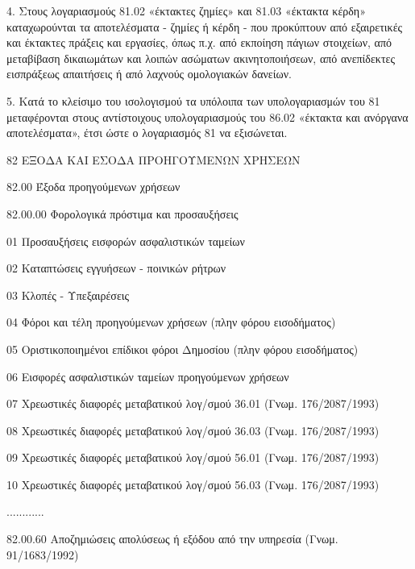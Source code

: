 \documentclass[A4,10pt,greek]{book}
\begin{document}
4. Στους λογαριασμούς 81.02 «έκτακτες ζημίες» και 81.03 «έκτακτα κέρδη» καταχωρούνται τα αποτελέσματα - ζημίες ή κέρδη - που προκύπτουν από εξαιρετικές και έκτακτες πράξεις και εργασίες, όπως π.χ. από εκποίηση πάγιων στοιχείων, από μεταβίβαση δικαιωμάτων και λοιπών ασώματων ακινητοποιήσεων, από ανεπίδεκτες εισπράξεως απαιτήσεις ή από λαχνούς ομολογιακών δανείων.

5. Κατά το κλείσιμο του ισολογισμού τα υπόλοιπα των υπολογαριασμών του 81 μεταφέρονται στους αντίστοιχους υπολογαριασμούς του 86.02 «έκτακτα και ανόργανα αποτελέσματα», έτσι ώστε ο λογαριασμός 81 να εξισώνεται.

82    ΕΞΟΔΑ ΚΑΙ ΕΣΟΔΑ ΠΡΟΗΓΟΥΜΕΝΩΝ ΧΡΗΣΕΩΝ

        82.00    Έξοδα προηγούμενων χρήσεων

                     82.00.00    Φορολογικά πρόστιμα και προσαυξήσεις

                               01    Προσαυξήσεις εισφορών ασφαλιστικών ταμείων

                               02    Καταπτώσεις εγγυήσεων - ποινικών ρήτρων

                               03    Κλοπές - Υπεξαιρέσεις

                               04    Φόροι και τέλη προηγούμενων χρήσεων (πλην φόρου
                                       εισοδήματος)

                               05    Οριστικοποιημένοι επίδικοι φόροι Δημοσίου (πλην φόρου
                                       εισοδήματος)

                               06    Εισφορές ασφαλιστικών ταμείων προηγούμενων χρήσεων

                               07    Χρεωστικές διαφορές μεταβατικού λογ/σμού 36.01
                                       (Γνωμ. 176/2087/1993)

                               08    Χρεωστικές διαφορές μεταβατικού λογ/σμού 36.03
                                       (Γνωμ. 176/2087/1993)

                               09    Χρεωστικές διαφορές μεταβατικού λογ/σμού 56.01
                                       (Γνωμ. 176/2087/1993)

                               10    Χρεωστικές διαφορές μεταβατικού λογ/σμού 56.03
                                       (Γνωμ. 176/2087/1993)

                     ............

                     82.00.60    Αποζημιώσεις απολύσεως ή εξόδου από την υπηρεσία
                                       (Γνωμ. 91/1683/1992)
\end{document}
